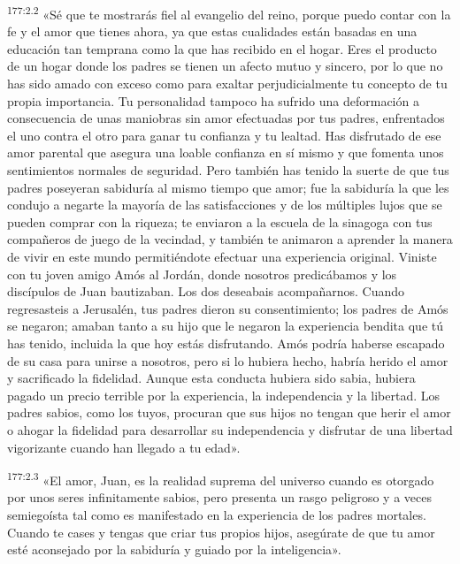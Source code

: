 \par
\textsuperscript{177:2.2} «Sé que te mostrarás fiel al evangelio del reino, porque puedo contar con la fe y el amor que tienes ahora, ya que estas cualidades están basadas en una educación tan temprana como la que has recibido en el hogar. Eres el producto de un hogar donde los padres se tienen un afecto mutuo y sincero, por lo que no has sido amado con exceso como para exaltar perjudicialmente tu concepto de tu propia importancia. Tu personalidad tampoco ha sufrido una deformación a consecuencia de unas maniobras sin amor efectuadas por tus padres, enfrentados el uno contra el otro para ganar tu confianza y tu lealtad. Has disfrutado de ese amor parental que asegura una loable confianza en sí mismo y que fomenta unos sentimientos normales de seguridad. Pero también has tenido la suerte de que tus padres poseyeran sabiduría al mismo tiempo que amor; fue la sabiduría la que les condujo a negarte la mayoría de las satisfacciones y de los múltiples lujos que se pueden comprar con la riqueza; te enviaron a la escuela de la sinagoga con tus compañeros de juego de la vecindad, y también te animaron a aprender la manera de vivir en este mundo permitiéndote efectuar una experiencia original. Viniste con tu joven amigo Amós al Jordán, donde nosotros predicábamos y los discípulos de Juan bautizaban. Los dos deseabais acompañarnos. Cuando regresasteis a Jerusalén, tus padres dieron su consentimiento; los padres de Amós se negaron; amaban tanto a su hijo que le negaron la experiencia bendita que tú has tenido, incluida la que hoy estás disfrutando. Amós podría haberse escapado de su casa para unirse a nosotros, pero si lo hubiera hecho, habría herido el amor y sacrificado la fidelidad. Aunque esta conducta hubiera sido sabia, hubiera pagado un precio terrible por la experiencia, la independencia y la libertad. Los padres sabios, como los tuyos, procuran que sus hijos no tengan que herir el amor o ahogar la fidelidad para desarrollar su independencia y disfrutar de una libertad vigorizante cuando han llegado a tu edad».

\par
\textsuperscript{177:2.3} «El amor, Juan, es la realidad suprema del universo cuando es otorgado por unos seres infinitamente sabios, pero presenta un rasgo peligroso y a veces semiegoísta tal como es manifestado en la experiencia de los padres mortales. Cuando te cases y tengas que criar tus propios hijos, asegúrate de que tu amor esté aconsejado por la sabiduría y guiado por la inteligencia».

